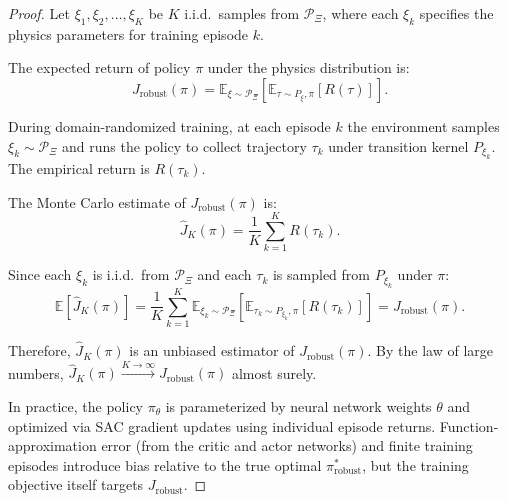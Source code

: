 \documentclass[10pt,twocolumn,letterpaper]{article}
\begin{document}
\begin{proof}
Let $\xi_1, \xi_2, \ldots, \xi_K$ be $K$ i.i.d.\ samples from $\mathcal{P}_\Xi$, where each $\xi_k$ specifies the physics parameters for training episode $k$.

The expected return of policy $\pi$ under the physics distribution is:
\[
J_{\mathrm{robust}}(\pi) = \mathbb{E}_{\xi \sim \mathcal{P}_\Xi}\!\left[\mathbb{E}_{\tau \sim P_\xi, \pi}[R(\tau)]\right].
\]

During domain-randomized training, at each episode $k$ the environment samples $\xi_k \sim \mathcal{P}_\Xi$ and runs the policy to collect trajectory $\tau_k$ under transition kernel $P_{\xi_k}$. The empirical return is $R(\tau_k)$.

The Monte Carlo estimate of $J_{\mathrm{robust}}(\pi)$ is:
\[
\hat{J}_K(\pi) = \frac{1}{K}\sum_{k=1}^{K} R(\tau_k).
\]

Since each $\xi_k$ is i.i.d.\ from $\mathcal{P}_\Xi$ and each $\tau_k$ is sampled from $P_{\xi_k}$ under $\pi$:
\[
\mathbb{E}[\hat{J}_K(\pi)] = \frac{1}{K}\sum_{k=1}^{K} \mathbb{E}_{\xi_k \sim \mathcal{P}_\Xi}\!\left[\mathbb{E}_{\tau_k \sim P_{\xi_k},\pi}[R(\tau_k)]\right] = J_{\mathrm{robust}}(\pi).
\]

Therefore, $\hat{J}_K(\pi)$ is an unbiased estimator of $J_{\mathrm{robust}}(\pi)$. By the law of large numbers, $\hat{J}_K(\pi) \xrightarrow{K \to \infty} J_{\mathrm{robust}}(\pi)$ almost surely.

In practice, the policy $\pi_\theta$ is parameterized by neural network weights $\theta$ and optimized via SAC gradient updates using individual episode returns. Function-approximation error (from the critic and actor networks) and finite training episodes introduce bias relative to the true optimal $\pi^*_{\mathrm{robust}}$, but the training objective itself targets $J_{\mathrm{robust}}$.
\end{proof}
\end{document}
